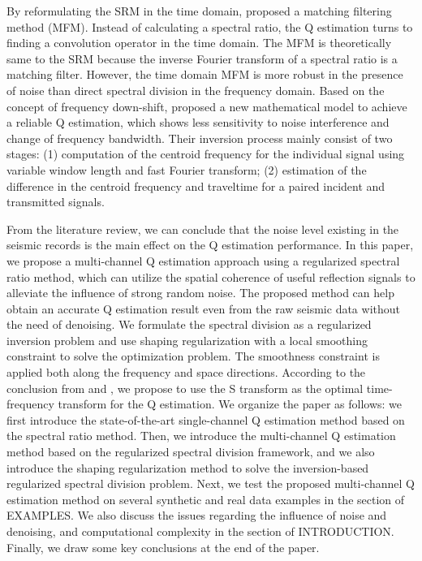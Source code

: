 By reformulating the SRM in the time domain, \cite{pengcheng2012} proposed a matching filtering method  (MFM). Instead of calculating a spectral ratio, the Q estimation turns to finding a convolution operator in the time domain. The MFM is theoretically same to the SRM because the inverse Fourier transform of a spectral ratio is a matching filter. However, the time domain MFM is more robust in the presence of noise than direct spectral division in the frequency domain. Based on the concept of frequency down-shift, \cite{raji2013} proposed a new mathematical model to achieve a reliable Q estimation, which shows less sensitivity to noise interference and change of frequency bandwidth. Their inversion process mainly consist of two stages: (1) computation of the centroid frequency for the individual signal using variable window length and fast Fourier transform; (2) estimation of the difference in the centroid frequency and traveltime for a paired incident and transmitted signals. 

From the literature review, we can conclude that the noise level existing in the seismic records is the main effect on the Q estimation performance. In this paper, we propose a multi-channel Q estimation approach using a regularized spectral ratio method, which can utilize the spatial coherence of useful reflection signals to alleviate the influence of strong random noise. The proposed method can help obtain an accurate Q estimation result even from the raw seismic data without the need of denoising. We formulate the spectral division as a regularized inversion problem and use shaping regularization with a local smoothing constraint to solve the optimization problem. The smoothness constraint is applied both along the frequency and space directions. According to the conclusion from \cite{reine2009} and \cite{guochang2010}, we propose to use the S transform \cite[]{stockwell1996} as the optimal time-frequency transform for the Q estimation. We organize the paper as follows: we first introduce the state-of-the-art single-channel Q estimation method based on the spectral ratio method. Then, we introduce the multi-channel Q estimation method based on the regularized spectral division framework, and we also introduce the shaping regularization method to solve the inversion-based regularized spectral division problem. Next, we test the proposed multi-channel Q estimation method on several synthetic and real data examples in the section of EXAMPLES. We also discuss the issues regarding the influence of noise and denoising, and computational complexity in the section of INTRODUCTION. Finally, we draw some key conclusions at the end of the paper.

